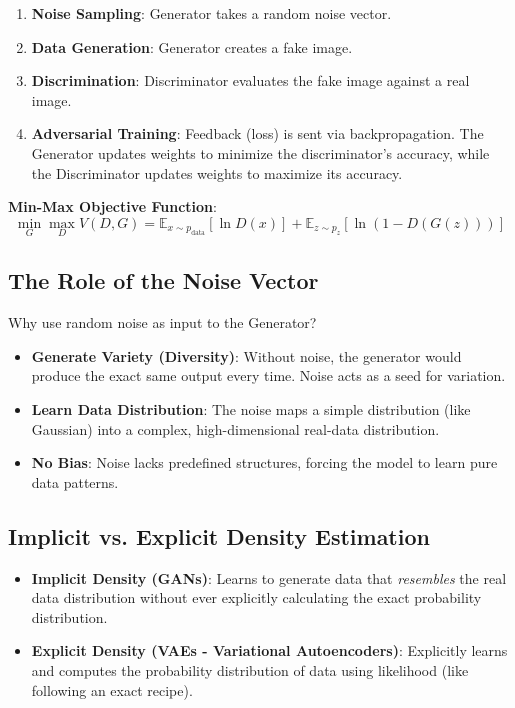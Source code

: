 \documentclass[11pt,a4paper]{article}
\begin{document}
\begin{tcolorbox}[colback=blue!5!white,colframe=blue!75!black,title=\textbf{Training Loop (Min-Max Loss)}]
\begin{enumerate}
    \item \textbf{Noise Sampling}: Generator takes a random noise vector.
    \item \textbf{Data Generation}: Generator creates a fake image.
    \item \textbf{Discrimination}: Discriminator evaluates the fake image against a real image.
    \item \textbf{Adversarial Training}: Feedback (loss) is sent via backpropagation. The Generator updates weights to minimize the discriminator's accuracy, while the Discriminator updates weights to maximize its accuracy.
\end{enumerate}
\end{tcolorbox}

\textbf{Min-Max Objective Function}:
\[
\min_G \max_D V(D, G) = \mathbb{E}_{x \sim p_{\text{data}}} [\ln D(x)] + \mathbb{E}_{z \sim p_z} [\ln(1 - D(G(z)))]
\]

\subsection{The Role of the Noise Vector}

Why use random noise as input to the Generator?
\begin{itemize}
    \item \textbf{Generate Variety (Diversity)}: Without noise, the generator would produce the exact same output every time. Noise acts as a seed for variation.
    \item \textbf{Learn Data Distribution}: The noise maps a simple distribution (like Gaussian) into a complex, high-dimensional real-data distribution.
    \item \textbf{No Bias}: Noise lacks predefined structures, forcing the model to learn pure data patterns.
\end{itemize}

\subsection{Implicit vs. Explicit Density Estimation}

\begin{itemize}
    \item \textbf{Implicit Density (GANs)}: Learns to generate data that \textit{resembles} the real data distribution without ever explicitly calculating the exact probability distribution.
    \item \textbf{Explicit Density (VAEs - Variational Autoencoders)}: Explicitly learns and computes the probability distribution of data using likelihood (like following an exact recipe).
\end{itemize}
\end{document}
